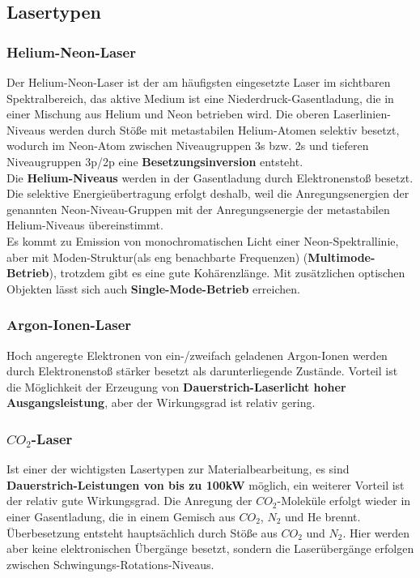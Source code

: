 \documentclass[12pt,a4paper,ngerman]{article}
\begin{document}
\subsection{Lasertypen}
\subsubsection*{Helium-Neon-Laser}
Der Helium-Neon-Laser ist der am häufigsten eingesetzte Laser im sichtbaren Spektralbereich, das aktive Medium ist eine Niederdruck-Gasentladung, die in einer Mischung aus Helium und Neon betrieben wird. Die oberen Laserlinien-Niveaus werden durch Stöße mit metastabilen Helium-Atomen selektiv besetzt, wodurch im Neon-Atom zwischen Niveaugruppen 3s bzw. 2s und tieferen Niveaugruppen 3p/2p eine \textbf{Besetzungsinversion} entsteht. \\
Die \textbf{Helium-Niveaus} werden in der Gasentladung durch Elektronenstoß besetzt. Die selektive Energieübertragung erfolgt deshalb, weil die Anregungsenergien der genannten Neon-Niveau-Gruppen mit der Anregungsenergie der metastabilen Helium-Niveaus übereinstimmt. \\
Es kommt zu Emission von monochromatischen Licht einer Neon-Spektrallinie, aber mit Moden-Struktur(als eng benachbarte Frequenzen) (\textbf{Multimode-Betrieb}), trotzdem gibt es eine gute Kohärenzlänge. Mit zusätzlichen optischen Objekten lässt sich auch \textbf{Single-Mode-Betrieb} erreichen. 

\subsubsection*{Argon-Ionen-Laser}
Hoch angeregte Elektronen von ein-/zweifach geladenen Argon-Ionen werden durch Elektronenstoß stärker besetzt als darunterliegende Zustände. Vorteil ist die Möglichkeit der Erzeugung von \textbf{Dauerstrich-Laserlicht hoher Ausgangsleistung}, aber der Wirkungsgrad ist relativ gering. 

\subsubsection*{$CO_2$-Laser}
Ist einer der wichtigsten Lasertypen zur Materialbearbeitung, es sind \textbf{Dauerstrich-Leistungen von bis zu 100kW} möglich, ein weiterer Vorteil ist der relativ gute Wirkungsgrad. Die Anregung der $CO_2$-Moleküle erfolgt wieder in einer Gasentladung, die in einem Gemisch aus $CO_2$, $N_2$ und He brennt. Überbesetzung entsteht hauptsächlich durch Stöße aus $CO_2$ und $N_2$. Hier werden aber keine elektronischen Übergänge besetzt, sondern die Laserübergänge erfolgen zwischen Schwingungs-Rotations-Niveaus. 
\end{document}
